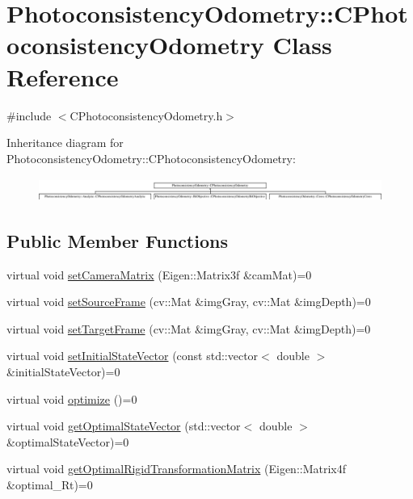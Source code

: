 \hypertarget{class_photoconsistency_odometry_1_1_c_photoconsistency_odometry}{
\section{PhotoconsistencyOdometry::CPhotoconsistencyOdometry Class Reference}
\label{class_photoconsistency_odometry_1_1_c_photoconsistency_odometry}
}


{\ttfamily \#include $<$CPhotoconsistencyOdometry.h$>$}

Inheritance diagram for PhotoconsistencyOdometry::CPhotoconsistencyOdometry:\begin{figure}[H]
\begin{center}
\leavevmode
\includegraphics[height=0.779402cm]{class_photoconsistency_odometry_1_1_c_photoconsistency_odometry}
\end{center}
\end{figure}
\subsection*{Public Member Functions}
\begin{DoxyCompactItemize}
\item 
virtual void \hyperlink{class_photoconsistency_odometry_1_1_c_photoconsistency_odometry_a7464fc533b08dc7150eabd1086b84155}{setCameraMatrix} (Eigen::Matrix3f \&camMat)=0
\item 
virtual void \hyperlink{class_photoconsistency_odometry_1_1_c_photoconsistency_odometry_aa017bf63aeb6f3103d1b6fec8d38a888}{setSourceFrame} (cv::Mat \&imgGray, cv::Mat \&imgDepth)=0
\item 
virtual void \hyperlink{class_photoconsistency_odometry_1_1_c_photoconsistency_odometry_ac22e57f7f5039b7988447e7bd7d77f89}{setTargetFrame} (cv::Mat \&imgGray, cv::Mat \&imgDepth)=0
\item 
virtual void \hyperlink{class_photoconsistency_odometry_1_1_c_photoconsistency_odometry_a425e6bc2fbbc9dcf924ae197f5569ddf}{setInitialStateVector} (const std::vector$<$ double $>$ \&initialStateVector)=0
\item 
virtual void \hyperlink{class_photoconsistency_odometry_1_1_c_photoconsistency_odometry_aa7b0f04764e2c348556193281de58639}{optimize} ()=0
\item 
virtual void \hyperlink{class_photoconsistency_odometry_1_1_c_photoconsistency_odometry_a60e50c92161d1c2c1090757358ddba92}{getOptimalStateVector} (std::vector$<$ double $>$ \&optimalStateVector)=0
\item 
virtual void \hyperlink{class_photoconsistency_odometry_1_1_c_photoconsistency_odometry_a319f97afb21523fa6c66e9a04a607ea6}{getOptimalRigidTransformationMatrix} (Eigen::Matrix4f \&optimal\_\-Rt)=0
\end{DoxyCompactItemize}



